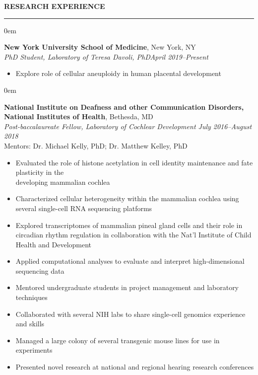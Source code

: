 \documentclass[11pt, letterpaper]{article}
\newenvironment{CVSection}{
\begin{addmargin}[2em]{0em}
\begin{samepage}}
{\end{samepage}
\end{addmargin}\bigskip}
\newcommand{\CVHeading}[1]{
\MakeUppercase{\bf #1}
\smallskip
\hrule
\medskip
}
\begin{document}
\CVHeading{Research Experience}
\begin{CVSection}
\textbf{New York University School of Medicine}, New York, NY\\
\textsl{PhD Student, Laboratory of Teresa Davoli, PhD\hfill April 2019--Present}
\begin{itemize}
    \item Explore role of cellular aneuploidy in human placental development
\end{itemize}
\end{CVSection}
\begin{CVSection}
\textbf{National Institute on Deafness and other Communication Disorders,\\National Institutes of Health}, Bethesda, MD\\
\textsl{Post-baccalaureate Fellow, Laboratory of Cochlear Development	\hfill July 2016--August 2018\\}
Mentors: Dr. Michael Kelly, PhD; Dr. Matthew Kelley, PhD
\begin{itemize}
\item Evaluated the role of histone acetylation in cell identity maintenance and fate plasticity in the\\ developing mammalian cochlea
\item Characterized cellular heterogeneity within the mammalian cochlea using several single-cell RNA sequencing platforms
\item Explored transcriptomes of mammalian pineal gland cells and their role in circadian rhythm regulation in collaboration with the Nat'l Institute of Child Health and Development
\item Applied computational analyses to evaluate and interpret high-dimensional sequencing data
\item Mentored undergraduate students in project management and laboratory techniques
\item Collaborated with several NIH labs to share single-cell genomics experience and skills
\item Managed a large colony of several transgenic mouse lines for use in experiments
\item Presented novel research at national and regional hearing research conferences
\end{itemize}
\end{CVSection}
\end{document}
